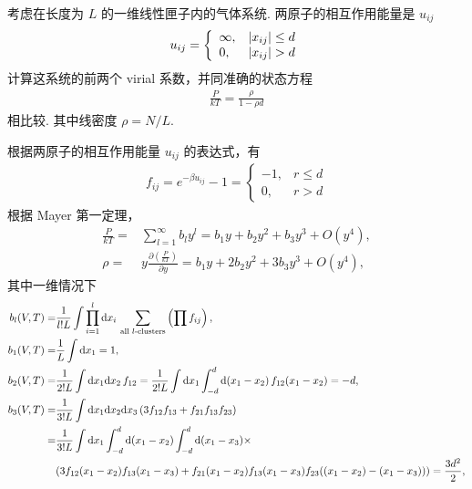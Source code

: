 \documentclass{assignment}
\begin{document}
\begin{prob}
    考虑在长度为 $L$ 的一维线性匣子内的气体系统. 两原子的相互作用能量是 $u_{ij}$
    \begin{align}
        u_{ij}=\left\{\begin{array}{ll}
            \infty,&\left\lvert x_{ij}\right\rvert\leq d\\
            0,&\left\lvert x_{ij}\right\rvert>d
        \end{array}\right.
    \end{align}
    计算这系统的前两个 virial 系数，并同准确的状态方程
    \begin{align}
        \frac{P}{kT}=\frac{\rho}{1-\rho d}
    \end{align}
    相比较. 其中线密度 $\rho=N/L$.
\end{prob}
\begin{sol}
    根据两原子的相互作用能量 $u_{ij}$ 的表达式，有
    \begin{align}
        f_{ij}=e^{-\beta u_{ij}}-1=\left\{\begin{array}{ll}
            -1,&r\leq d\\
            0,&r>d
        \end{array}\right.
    \end{align}
    根据 Mayer 第一定理，
    \begin{align}
        \label{2-P/kT}
        \frac{P}{kT}=&\sum_{l=1}^{\infty}b_ly^l=b_1y+b_2y^2+b_3y^3+O(y^4),\\
        \label{2-rho}
        \rho=&y\frac{\partial\left(\frac{P}{kT}\right)}{\partial y}=b_1y+2b_2y^2+3b_3y^3+O(y^4),
    \end{align}
    其中一维情况下
    \begin{align}
        b_l(V,T)=&\frac{1}{l!L}\int\prod_{i=1}^l\mathrm{d}x_i\,\sum_{\text{all $l$-clusters}}\left(\prod f_{ij}\right),\\
        b_1(V,T)=&\frac{1}{L}\int\mathrm{d}x_1=1,\\
        b_2(V,T)=&\frac{1}{2!L}\int\mathrm{d}x_1\mathrm{d}x_2\,f_{12}=\frac{1}{2!L}\int\mathrm{d}x_1\int_{-d}^d\mathrm{d}(x_1-x_2)\,f_{12}(x_1-x_2)=-d,\\
        \notag b_3(V,T)=&\frac{1}{3!L}\int\mathrm{d}x_1\mathrm{d}x_2\mathrm{d}x_3\,(3f_{12}f_{13}+f_{21}f_{13}f_{23})\\
        \notag=&\frac{1}{3!L}\int\mathrm{d}x_1\int_{-d}^d\mathrm{d}(x_1-x_2)\int_{-d}^d\mathrm{d}(x_1-x_3)\times\\
        &(3f_{12}(x_1-x_2)f_{13}(x_1-x_3)+f_{21}(x_1-x_2)f_{13}(x_1-x_3)f_{23}((x_1-x_2)-(x_1-x_3)))=\frac{3d^2}{2},

\end{align}
\end{sol}
\end{document}
